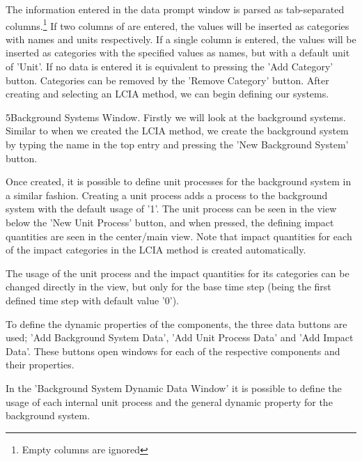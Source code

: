 
The information entered in the data prompt window is parsed as tab-separated columns.\footnote{Empty columns are ignored} If two columns of are entered, the values will be inserted as categories with names and units respectively. If a single column is entered, the values will be inserted as categories with the specified values as names, but with a default unit of 'Unit'. If no data is entered it is equivalent to pressing the 'Add Category' button. Categories can be removed by the 'Remove Category' button. After creating and selecting an LCIA method, we can begin defining our systems.

\guide
{5}{Background Systems Window.}
Firstly we will look at the background systems. Similar to when we created the LCIA method, we create the background system by typing the name in the top entry and pressing the 'New Background System' button.

Once created, it is possible to define unit processes for the background system in a similar fashion. Creating a unit process adds a process to the background system with the default usage of '1'. The unit process can be seen in the view below the 'New Unit Process' button, and when pressed, the defining impact quantities are seen in the center/main view. Note that impact quantities for each of the impact categories in the LCIA method is created automatically.

The usage of the unit process and the impact quantities for its categories can be changed directly in the view, but only for the base time step (being the first defined time step with default value '0'). 


To define the dynamic properties of the components, the three data buttons are used; 'Add Background System Data', 'Add Unit Process Data' and 'Add Impact Data'. These buttons open windows for each of the respective components and their properties.

In the 'Background System Dynamic Data Window' it is possible to define the usage of each internal unit process and the general dynamic property for the background system. 

